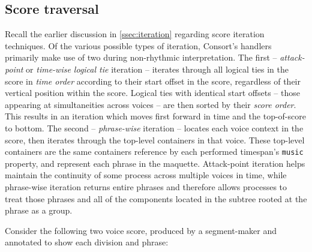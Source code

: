 \subsection{Score traversal}
\label{ssec:score-traversal}

Recall the earlier discussion in \autoref{ssec:iteration} regarding score
iteration techniques. Of the various possible types of iteration, Consort's
handlers primarily make use of two during non-rhythmic interpretation. The
first -- \emph{attack-point} or \emph{time-wise logical tie} iteration --
iterates through all logical ties in the score in \emph{time order} according
to their start offset in the score, regardless of their vertical position
within the score. Logical ties with identical start offsets -- those appearing
at simultaneities across voices -- are then sorted by their \emph{score order}.
This results in an iteration which moves first forward in time and the
top-of-score to bottom. The second -- \emph{phrase-wise} iteration -- locates
each voice context in the score, then iterates through the top-level containers
in that voice. These top-level containers are the same containers reference by
each performed timespan's \texttt{music} property, and represent each phrase in
the maquette. Attack-point iteration helps maintain the continuity of some
process across multiple voices in time, while phrase-wise iteration returns
entire phrases and therefore allows processes to treat those phrases and all of
the components located in the subtree rooted at the phrase as a group.

Consider the following two voice score, produced by a segment-maker and
annotated to show each division and phrase:

\begin{comment}
<abjad>[stylesheet=../consort.ily]
music_specifier = consort.MusicSpecifier(
    attachment_handler=consort.AttachmentHandler(),
    rhythm_maker=rhythmmakertools.TaleaRhythmMaker(
        extra_counts_per_division=(0, 1),
        talea=rhythmmakertools.Talea([2, 3, 2, 4], 16),
        ),
    )
timespan_maker = consort.TaleaTimespanMaker(
    initial_silence_talea=rhythmmakertools.Talea([0, 1], 4),
    playing_groupings=(1, 2, 2, 1, 2),
    playing_talea=rhythmmakertools.Talea([2, 3], 8),
    silence_talea=rhythmmakertools.Talea([1, 2, 3, 4], 8),
    )
music_setting = consort.MusicSetting(
    timespan_maker=timespan_maker,
    v1=music_specifier,
    v2=music_specifier,
    )
segment_maker = consort.SegmentMaker(
    desired_duration_in_seconds=8,
    discard_final_silence=True,
    permitted_time_signatures=[(2, 4), (5, 16), (3, 4)],
    score_template=templatetools.GroupedRhythmicStavesScoreTemplate(
        staff_count=2,
        with_clefs=True,
        ),
    settings=[music_setting],
    tempo=indicatortools.Tempo((1, 4), 72),
    )
illustration = segment_maker(annotate=True, verbose=False)
show(illustration)
</abjad>
\end{comment}

